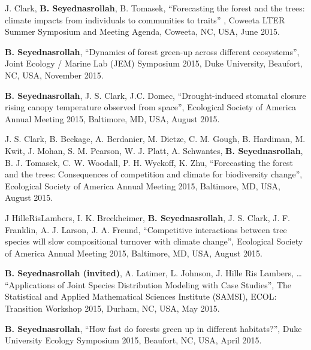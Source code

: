 \documentclass[10pt]{article}
\newenvironment{changemargin}[2]{%
  \begin{list}{}{%
 \setlength{\topsep}{0pt}%
 \setlength{\leftmargin}{#1}%
 \setlength{\rightmargin}{#2}%
 \setlength{\listparindent}{\parindent}%
 \setlength{\itemindent}{\parindent}%
 \setlength{\parsep}{\parskip}%
  }%
  \item[]}{\end{list}
}
\newenvironment{body} {
  \vspace*{-2pt}
  \begin{changemargin}{-0.5in}{-0.5in}
}
{\end{changemargin}
}
\begin{document}
\begin{body}
\begin{etaremune}
    \item J. Clark, \textbf {B. Seyednasrollah}, B.  Tomasek, ``Forecasting the forest and the trees: climate impacts from individuals to communities to traits'' , Coweeta LTER Summer Symposium and Meeting Agenda, Coweeta, NC, USA, June 2015.\\
    \medskip

    \item \textbf{B. Seyednasrollah}, ``Dynamics of forest green-up across different ecosystems'', Joint Ecology / Marine Lab (JEM) Symposium 2015, Duke University, Beaufort, NC, USA, November 2015.\\
    \medskip

    \item \textbf{B. Seyednasrollah}, J. S. Clark, J.C. Domec, ``Drought-induced stomatal closure rising canopy temperature observed from space'', Ecological Society of America Annual Meeting 2015, Baltimore, MD, USA, August 2015.\\
    \medskip

    \item J. S. Clark, B. Beckage, A. Berdanier, M. Dietze, C. M. Gough, B. Hardiman, M. Kwit, J. Mohan, S. M. Pearson, W. J. Platt, A. Schwantes, \textbf{B. Seyednasrollah}, B. J. Tomasek, C. W. Woodall, P. H. Wyckoff, K. Zhu, ``Forecasting the forest and the trees: Consequences of competition and climate for biodiversity change'', Ecological Society of America Annual Meeting 2015, Baltimore, MD, USA, August 2015.\\
    \medskip

    \item J HilleRisLambers, I. K. Breckheimer, \textbf{B. Seyednasrollah}, J. S. Clark, J. F. Franklin, A. J. Larson, J. A. Freund, ``Competitive interactions between tree species will slow compositional turnover with climate change'', Ecological Society of America Annual Meeting 2015, Baltimore, MD, USA, August 2015.\\
    \medskip


    \item \textbf{B. Seyednasrollah (invited)}, A. Latimer, L. Johnson, J. Hille Ris Lambers, … ``Applications of Joint Species Distribution Modeling with Case Studies'', The Statistical and Applied Mathematical Sciences Institute (SAMSI), ECOL: Transition Workshop 2015, Durham, NC, USA, May 2015.\\
    \medskip

    \item \textbf{B. Seyednasrollah}, ``How fast do forests green up in different habitats?'', Duke University Ecology Symposium 2015, Beaufort, NC, USA, April 2015.\\
    \medskip



\end{etaremune}
\end{body}
\end{document}
